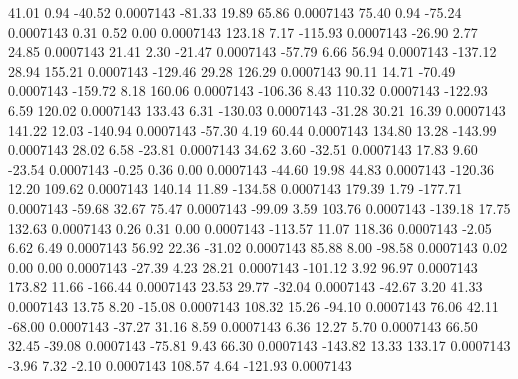       41.01        0.94      -40.52     0.0007143
      -81.33       19.89       65.86     0.0007143
       75.40        0.94      -75.24     0.0007143
        0.31        0.52        0.00     0.0007143
      123.18        7.17     -115.93     0.0007143
      -26.90        2.77       24.85     0.0007143
       21.41        2.30      -21.47     0.0007143
      -57.79        6.66       56.94     0.0007143
     -137.12       28.94      155.21     0.0007143
     -129.46       29.28      126.29     0.0007143
       90.11       14.71      -70.49     0.0007143
     -159.72        8.18      160.06     0.0007143
     -106.36        8.43      110.32     0.0007143
     -122.93        6.59      120.02     0.0007143
      133.43        6.31     -130.03     0.0007143
      -31.28       30.21       16.39     0.0007143
      141.22       12.03     -140.94     0.0007143
      -57.30        4.19       60.44     0.0007143
      134.80       13.28     -143.99     0.0007143
       28.02        6.58      -23.81     0.0007143
       34.62        3.60      -32.51     0.0007143
       17.83        9.60      -23.54     0.0007143
       -0.25        0.36        0.00     0.0007143
      -44.60       19.98       44.83     0.0007143
     -120.36       12.20      109.62     0.0007143
      140.14       11.89     -134.58     0.0007143
      179.39        1.79     -177.71     0.0007143
      -59.68       32.67       75.47     0.0007143
      -99.09        3.59      103.76     0.0007143
     -139.18       17.75      132.63     0.0007143
        0.26        0.31        0.00     0.0007143
     -113.57       11.07      118.36     0.0007143
       -2.05        6.62        6.49     0.0007143
       56.92       22.36      -31.02     0.0007143
       85.88        8.00      -98.58     0.0007143
        0.02        0.00        0.00     0.0007143
      -27.39        4.23       28.21     0.0007143
     -101.12        3.92       96.97     0.0007143
      173.82       11.66     -166.44     0.0007143
       23.53       29.77      -32.04     0.0007143
      -42.67        3.20       41.33     0.0007143
       13.75        8.20      -15.08     0.0007143
      108.32       15.26      -94.10     0.0007143
       76.06       42.11      -68.00     0.0007143
      -37.27       31.16        8.59     0.0007143
        6.36       12.27        5.70     0.0007143
       66.50       32.45      -39.08     0.0007143
      -75.81        9.43       66.30     0.0007143
     -143.82       13.33      133.17     0.0007143
       -3.96        7.32       -2.10     0.0007143
      108.57        4.64     -121.93     0.0007143
